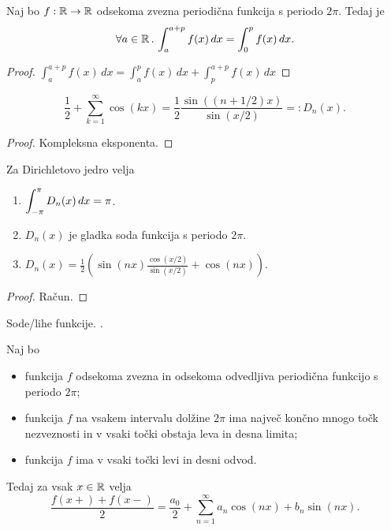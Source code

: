\begin{lema}
    Naj bo \(f: \mathbb{R} \to \mathbb{R}\) odsekoma zvezna periodična funkcija s periodo \(2\pi\). Tedaj je 
    \[
         \forall a \in \mathbb{R} \,.\, \int_{a}^{a+p} f(x) \, dx = \int_{0}^{p}  f(x) \, dx.
    \]
\end{lema}

\begin{proof}
    \(\int_{a}^{a+p} f(x) \, dx = \int_{a}^{p} f(x) \, dx + \int_{p}^{a+p} f(x) \, dx\)
\end{proof}

\begin{lema}
    \[\frac{1}{2} + \sum_{k=1}^{\infty} \cos(kx) = \frac{1}{2} \frac{\sin((n+1/2)x)}{\sin(x/2)} =: D_n(x).\]
\end{lema}

\begin{proof}
    Kompleksna eksponenta.
\end{proof}

\begin{lema}
    Za Dirichletovo jedro velja
    \begin{enumerate}
        \item \(\displaystyle \int_{-\pi}^{\pi} D_n(x) \, dx = \pi\).
        \item \(D_n(x)\) je gladka soda funkcija s periodo \(2\pi\).
        \item \(D_n(x) = \frac{1}{2} \left(\sin(nx)\frac{\cos(x/2)}{\sin(x/2)}  + \cos(nx)\right)\).
    \end{enumerate}
\end{lema}

\begin{proof}
    Račun.
\end{proof}

\begin{opomba}
    Sode/lihe funkcije. \todo{}.
\end{opomba}

\begin{izrek}
    Naj bo
    \begin{itemize}
        \item funkcija \(f\) odsekoma zvezna in odsekoma odvedljiva periodična funkcijo s periodo \(2\pi\);
        \item funkcija \(f\) na vsakem intervalu dolžine \(2\pi\) ima največ končno mnogo točk nezveznosti in v vsaki točki obstaja leva in desna limita;
        \item funkcija \(f\) ima v vsaki točki levi in desni odvod.
    \end{itemize}
    Tedaj za vsak \(x \in \mathbb{R}\) velja 
    \[
        \frac{f(x+) + f(x-)}{2} = \frac{a_0}{2} + \sum_{n=1}^{\infty} a_n \cos(nx) + b_n \sin(nx).
    \]
\end{izrek}


